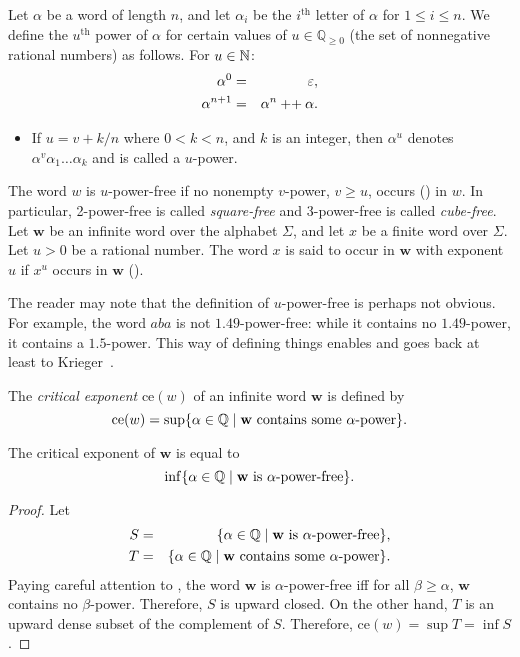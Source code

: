 		\begin{definition}\label{df:power}
			Let $\alpha$ be a word of length $n$, and let $\alpha_i$ be the $i^{\text{th}}$ letter of $\alpha$ for $1\le i\le n$.
			We define the $u^{\text{th}}$ power of $\alpha$ for certain values of
			$u\in\mathbb Q_{\ge 0}$ (the set of nonnegative rational numbers) as follows.
			For $u\in\mathbb{N}$:
			\begin{eqnarray*}
				\alpha^0 &=& \varepsilon,\\
				\alpha^{n+1} &=& \alpha^n \mathbin{{+}{+}} \alpha.
			\end{eqnarray*}
			\begin{itemize}
			\item If $u=v+k/n$ where $0<k<n$, and $k$ is an integer,
				then $\alpha^u$ denotes $\alpha^v \alpha_1\dots\alpha_k$ and is called a $u$-power.
			\end{itemize}
			The word $w$ is $u$-power-free if no nonempty $v$-power, $v\ge u$,
			occurs () in $w$.
			In particular, 2-power-free is called \emph{square-free}
			and 3-power-free is called \emph{cube-free}.
			Let $\mathbf{w}$ be an infinite word over the alphabet $\Sigma$, and let $x$ be a finite word over $\Sigma$.
			Let $u>0$ be a rational number.
			The word $x$ is said to occur in $\mathbf{w}$ with exponent $u$ if
			$x^{u}$ occurs in $\mathbf{w}$ ().
		\end{definition}
		The reader may note that the definition of $u$-power-free is perhaps not obvious.
		For example, the word $aba$ is not $1.49$-power-free: while it contains no $1.49$-power,
		it contains a $1.5$-power.
		This way of defining things enables  and goes back at least to Krieger~\cite[page 71]{MR2316392}.

		\begin{definition}\label{critExp}
			The \emph{critical exponent} $\mathrm{ce}(w)$ of an infinite word $\mathbf{w}$ is defined by
			\[
				\mathrm{ce}(w) = \sup \{\alpha\in\mathbb Q \mid \mathbf{w} \text{ contains some $\alpha$-power}\}.
			\]
		\end{definition}
		\begin{theorem}\label{thm:crit-exp}
			The critical exponent of $\mathbf w$ is equal to
			\[
				\inf \{\alpha\in\mathbb Q \mid \mathbf{w} \text{ is  $\alpha$-power-free}\}.
			\]
		\end{theorem}
		\begin{proof}
			Let
			\begin{eqnarray*}
				S&=&\{\alpha\in\mathbb Q \mid \mathbf{w} \text{ is  $\alpha$-power-free}\},\\
				T&=&\{\alpha\in\mathbb Q \mid \mathbf{w} \text{ contains some $\alpha$-power}\}.
			\end{eqnarray*}
			Paying careful attention to ,
			the word $\mathbf w$ is $\alpha$-power-free iff
			for all $\beta\ge\alpha$, $\mathbf w$ contains no $\beta$-power.
			Therefore, $S$ is upward closed.
			On the other hand, $T$ is an upward dense subset of the complement of $S$.
			Therefore, $\mathrm{ce}(w)=\sup T=\inf S$.
		\end{proof}

